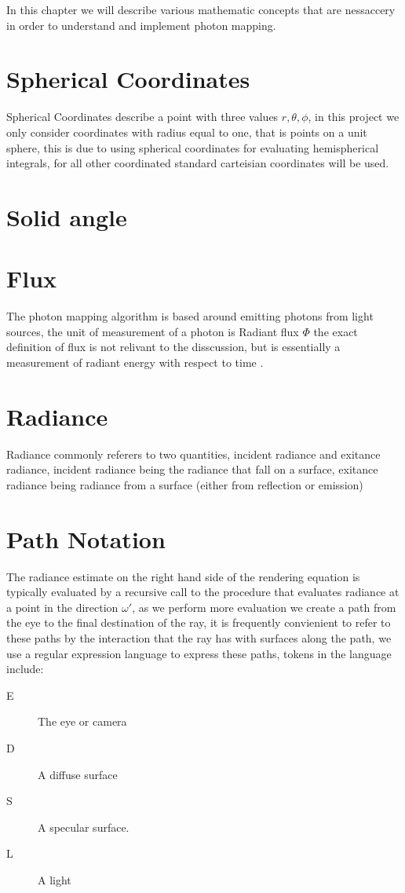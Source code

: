 In this chapter we will describe various mathematic concepts that are nessaccery in order to understand and implement photon mapping.

\section{Spherical Coordinates}
Spherical Coordinates describe a point with three values $r, \theta, \phi$, in this project we only consider coordinates with
radius equal to one, that is points on a unit sphere, this is due to using spherical coordinates for evaluating hemispherical
integrals, for all other coordinated standard carteisian coordinates will be used.


\section{Solid angle}

\section{Flux}
The photon mapping algorithm is based around emitting photons from light sources, the unit of measurement of a photon is
Radiant flux $\Phi$ the exact definition of flux is not relivant to the disscussion, but is essentially a measurement
of radiant energy with respect to time \cite{JensenBook}.

\section{Radiance}
Radiance commonly referers to two quantities, incident radiance and exitance radiance, incident radiance being the radiance
that fall on a surface, exitance radiance being radiance from a surface (either from reflection or emission)

\section{Path Notation}
The radiance estimate on the right hand side of the rendering equation is typically evaluated by a recursive call to the
procedure that evaluates radiance at a point in the direction $\omega'$, as we perform more evaluation we create a path
from the eye to the final destination of the ray, it is frequently convienient to refer to these paths by the interaction
that the ray has with surfaces along the path, we use a regular expression language to express these paths, tokens in the
language include:
\begin{description}
\item[E] The eye or camera
\item[D] A diffuse surface
\item[S] A specular surface.
\item[L] A light
\end{description}


